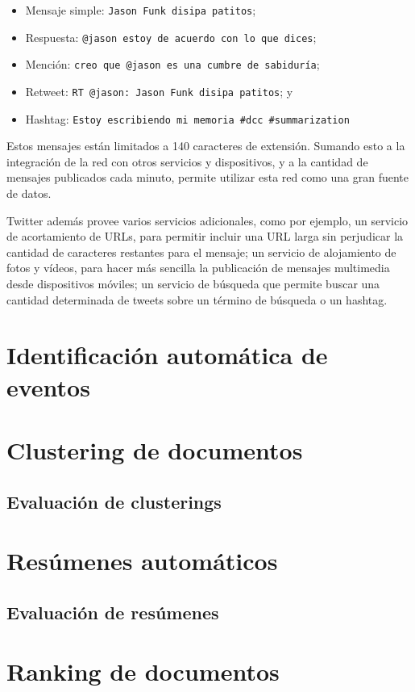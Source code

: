 \begin{itemize}
\item Mensaje simple: \texttt{Jason Funk disipa patitos};
\item Respuesta: \texttt{@jason estoy de acuerdo con lo que dices};
\item Mención: \texttt{creo que @jason es una cumbre de sabiduría};
\item Retweet: \texttt{RT @jason: Jason Funk disipa patitos}; y
\item Hashtag: \texttt{Estoy escribiendo mi memoria \#dcc \#summarization}
\end{itemize}
Estos mensajes están limitados a 140 caracteres de extensión. Sumando
esto a la integración de la red con otros servicios y dispositivos, y
a la cantidad de mensajes publicados cada minuto, permite utilizar
esta red como una gran fuente de datos.

Twitter además provee varios servicios adicionales, como por ejemplo,
un servicio de acortamiento de URLs, para permitir incluir una URL
larga sin perjudicar la cantidad de caracteres restantes para el
mensaje; un servicio de alojamiento de fotos y vídeos, para hacer más
sencilla la publicación de mensajes multimedia desde dispositivos
móviles; un servicio de búsqueda que permite buscar una cantidad
determinada de tweets sobre un término de búsqueda o un hashtag.


\section{Identificación automática de eventos}
\label{sec-2.2}

\section{Clustering de documentos}
\label{sec-2.3}

\subsection{Evaluación de clusterings}
\label{sec-2.3.1}

\section{Resúmenes automáticos}
\label{sec-2.4}

\subsection{Evaluación de resúmenes}
\label{sec-2.4.1}

\section{Ranking de documentos}
\label{sec-2.5}
